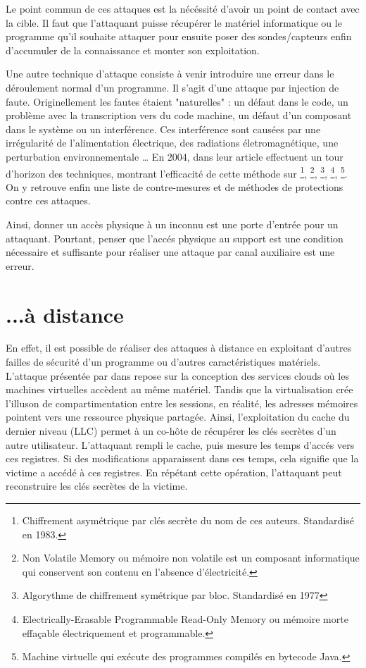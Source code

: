 Le point commun de ces attaques est la nécéssité d'avoir un point de contact avec la cible. Il faut que l'attaquant puisse récupérer le matériel informatique ou le programme qu'il souhaite attaquer pour ensuite poser des sondes/capteurs enfin d'accumuler de la connaissance et monter son exploitation.\bigbreak


Une autre technique d'attaque consiste à venir introduire une erreur dans le déroulement normal d'un programme. Il s'agit d'une attaque par injection de faute. Originellement \cite{faultOverview} les fautes étaient "naturelles" : un défaut dans le code, un problème avec la transcription vers du code machine, un défaut d'un composant dans le système ou un interférence. Ces interférence sont causées par une irrégularité de l'alimentation électrique, des radiations életromagnétique, une perturbation environnementale \etc\dots
En 2004, \citeauthor{Fault_Attacks} dans leur article  \cite{Fault_Attacks} effectuent un tour d'horizon des techniques, montrant l'efficacité de cette méthode sur \footnote{Chiffrement asymétrique par clés secrète du nom de ces auteurs. Standardisé en 1983.}, \footnote{Non Volatile Memory ou mémoire non volatile est un composant informatique qui conservent son contenu en l'absence d'électricité.}, \footnote{Algorythme de chiffrement symétrique par bloc. Standardisé en 1977}, \footnote{Electrically-Erasable Programmable Read-Only Memory ou mémoire morte effaçable électriquement et programmable.}, \footnote{Machine virtuelle qui exécute des programmes compilés en bytecode Java.}. On y retrouve enfin une liste de contre-mesures et de méthodes de protections contre ces attaques.\medbreak

Ainsi, donner un accès physique à un inconnu est une porte d'entrée pour un attaquant. Pourtant, penser que l'accés physique au support est une condition nécessaire et suffisante pour réaliser une attaque par canal auxiliaire est une erreur.

\section{...à distance}

En effet, il est possible de réaliser des attaques à distance en exploitant d'autres failles de sécurité d'un programme ou d'autres caractéristiques matériels. L'attaque présentée par \citeauthor{LLC_attack} dans  \cite{LLC_attack} repose sur la conception des services clouds où les machines virtuelles accèdent au même matériel. Tandis que la virtualisation crée l'illuson de compartimentation entre les sessions, en réalité, les adresses mémoires pointent vers une ressource physique partagée. Ainsi, l'exploitation du cache du dernier niveau (LLC) permet à un co-hôte de récupérer les clés secrètes d'un autre utilisateur. L'attaquant rempli le cache, puis mesure les temps d'accés vers ces registres. Si des modifications apparaissent dans ces temps, cela signifie que la victime a accédé à ces registres. En répétant cette opération, l'attaquant peut reconstruire les clés secrètes de la victime.\medbreak


